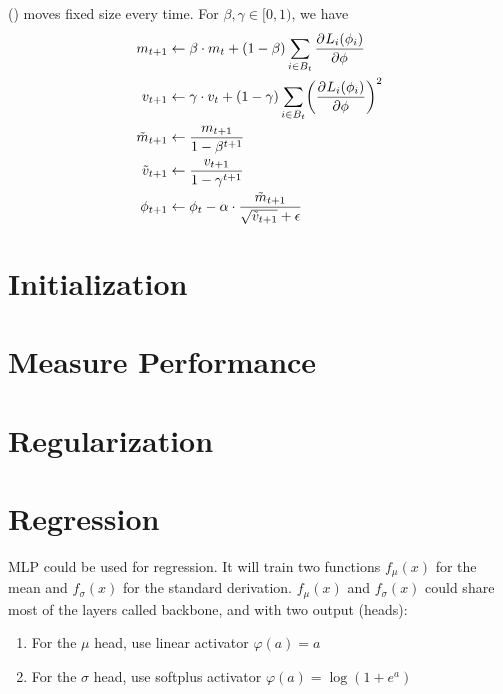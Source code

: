 () moves fixed size every time. For $\beta, \gamma \in [0,1)$, we have
\begin{equation}
    \begin{aligned}
        m_{t+1} &\leftarrow \beta \cdot m_t + (1-\beta) \sum_{i \in B_t} \dpd{L_i (\phi_i)}{\phi} \\
        v_{t+1} &\leftarrow \gamma \cdot v_t + (1-\gamma) \sum_{i \in B_t} \mleft({\dpd{L_i (\phi_i)}{\phi}}\mright)^2 \\
        \tilde{m}_{t+1} &\leftarrow \frac{m_{t+1}}{1- \beta^{t+1}} \\
        \tilde{v}_{t+1} &\leftarrow \frac{v_{t+1}}{1- \gamma^{t+1}} \\
        \phi_{t+1} &\leftarrow \phi_t - \alpha \cdot \frac{\tilde{m}_{t+1}}{\sqrt{\tilde{v}_{t+1}} + \epsilon}
    \end{aligned}
\end{equation}


\section{Initialization}



\section{Measure Performance}

\section{Regularization}


\section{Regression}

MLP could be used for regression. It will train two functions $f_\mu (x)$ for the mean and $f_\sigma (x)$ for the standard derivation. $f_\mu(x)$ and $f_\sigma(x)$ could share most of the layers called backbone, and with two output (heads):
\begin{enumerate}
    \item For the $\mu$ head, use linear activator $\varphi(a) = a$
    \item For the $\sigma$ head, use softplus activator $\varphi(a) = \log(1 + e^a)$
\end{enumerate}

